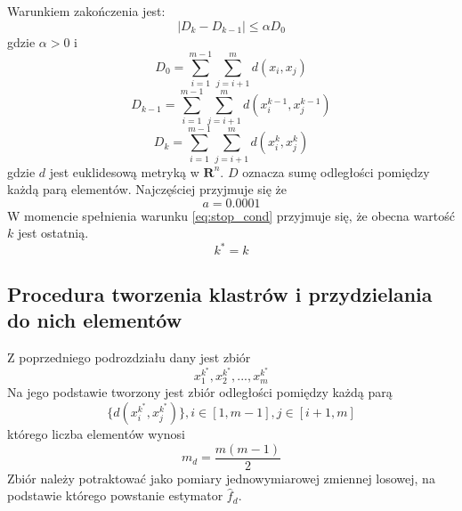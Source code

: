Warunkiem zakończenia jest:
\begin{equation} \label{eq:stop_cond}
|D_k-D_{k-1}| \leq \alpha D_0
\end{equation}
gdzie $\alpha>0$ i 
\begin{equation}
D_0 = \displaystyle\sum_{i=1}^{m-1} \displaystyle\sum_{j=i+1}^{m} d(x_i, x_j)
\end{equation}
\begin{equation}
D_{k-1} = \displaystyle\sum_{i=1}^{m-1} \displaystyle\sum_{j=i+1}^{m} d(x_i^{k-1}, x_j^{k-1})
\end{equation}
\begin{equation}
\label{eq:D_k}
D_{k} = \displaystyle\sum_{i=1}^{m-1} \displaystyle\sum_{j=i+1}^{m} d(x_i^{k}, x_j^{k})
\end{equation}
gdzie $d$ jest euklidesową metryką w $\mathbf{R}^n$. $D$ oznacza sumę odległości pomiędzy każdą parą elementów. Najczęściej przyjmuje się że
\begin{equation}
a= 0.0001
\end{equation}
W momencie spełnienia warunku \eqref{eq:stop_cond} przyjmuje się, że obecna wartość $k$ jest ostatnią.
\begin{equation}
k^*=k
\end{equation}

\subsection{Procedura tworzenia klastrów i przydzielania do nich elementów}
\label{subsec:tworzenie_klastrow}
Z poprzedniego podrozdziału dany jest zbiór
\begin{equation} \label{eq:set_init}
x^{k^*}_1, x^{k^*}_2, ..., x^{k^*}_m 
\end{equation}
Na jego podstawie tworzony jest zbiór odległości pomiędzy każdą parą
\begin{equation} \label{eq:set_x_k}
\{ d(x^{k^*}_i, x^{k^*}_j) \}, i \in [1, m-1], j \in [i+1,m]
\end{equation}
którego liczba elementów wynosi
\begin{equation}
m_d=\frac{m(m-1)}{2}
\end{equation}
Zbiór należy potraktować jako pomiary jednowymiarowej zmiennej losowej, na podstawie którego powstanie estymator $\hat{f}_d$.

